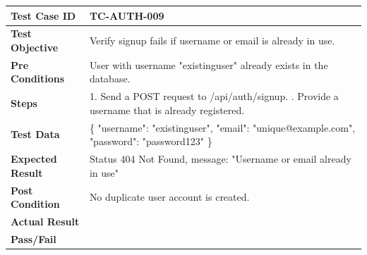 \begin{longtable}{|p{}|p{}|}
\hline
\textbf{Test Case ID} & TC-AUTH-009 \\ \hline
\textbf{Test Objective} & Verify signup fails if username or email is already in use. \\ \hline
\textbf{Pre Conditions} & User with username "existinguser" already exists in the database. \\ \hline
\textbf{Steps} & 
1. Send a POST request to /api/auth/signup. \newline
2. Provide a username that is already registered. \\ \hline
\textbf{Test Data} & \{ "username": "existinguser", "email": "unique@example.com", "password": "password123" \} \\ \hline
\textbf{Expected Result} & Status 404 Not Found, message: "Username or email already in use" \\ \hline
\textbf{Post Condition} & No duplicate user account is created. \\ \hline
\textbf{Actual Result} &  \\ \hline
\textbf{Pass/Fail} &  \\ \hline
\end{longtable}